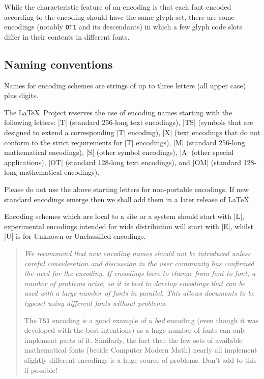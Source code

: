 \documentclass{ltxguide}[1994/11/20]
\providecommand{\Enc}[1]{\texttt{#1}}
\begin{document}
While the characteristic feature of an encoding is that each font
encoded according to the encoding should have the same glyph set,
there are some encodings (notably \Enc{OT1} and its descendants) in
which a few glyph code slots differ in their contents in different
fonts.

\subsection{Naming conventions}

Names for encoding schemes are strings of up to three letters (all
upper case) plus digits.

The \LaTeX\ Project reserves the use of encoding names starting with the
following letters: |T| (standard 256-long text encodings), |TS|
(symbols that are designed to extend a corresponding |T| encoding),
|X| (text encodings that do not conform to the strict requirements for
|T| encodings), |M| (standard 256-long mathematical encodings), |S| (other
symbol encodings), |A| (other special applications), |OT| (standard
128-long text encodings), and |OM| (standard 128-long mathematical encodings).

Please do not use the above starting letters for non-portable
encodings.  If new standard encodings emerge then we shall add them in
a later release of \LaTeX.

Encoding schemes which are local to a site or a system should start
with |L|, experimental encodings intended for wide distribution will
start with |E|, whilst |U| is for Unknown or Unclassified encodings.

\begin{quote}
  \itshape We recommend that new encoding names should not be
  introduced unless careful consideration and discussion in the user
  community has confirmed the need for the encoding. If encodings have to
  change from font to font, a number of problems arise, so it is best to
  develop encodings that can be used with a large number of fonts in parallel.
  This allows documents to be typeset using different fonts without problems.

  The \Enc{TS1} encoding is a good example of a \emph{bad} encoding (even
  though it was developed with the best intentions) as a huge number of fonts
  can only implement parts of it. Similarly, the fact that the few sets of
  available mathematical fonts (beside Computer Modern Math) nearly
  all implement slightly different encodings is a huge source of
  problems. Don't add to this if possible!
\end{quote}
\end{document}
